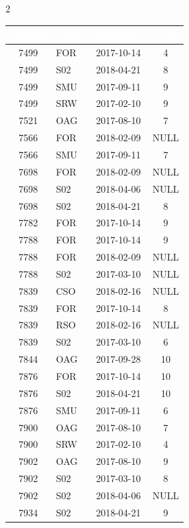 \documentclass[10pt,a4paper]{article}
\newcommand{\TBLH}[1]{\textbf{\textcolor{white}{#1}}}
\begin{document}
\begin{multicols}{2}
{\scriptsize
\begin{tabular}{|c|l|l|c|}
\hline
\rowcolor{tblhead}\TBLH{student} & \TBLH{course} & \TBLH{begindate} & \TBLH{eval} \\ \hline
7499 & FOR & 2017-10-14 & 4    \\ \hline
\rowcolor{rowalt}
7499 & S02 & 2018-04-21 & 8    \\ \hline
7499 & SMU & 2017-09-11 & 9    \\ \hline
\rowcolor{rowalt}
7499 & SRW & 2017-02-10 & 9    \\ \hline
7521 & OAG & 2017-08-10 & 7    \\ \hline
\rowcolor{rowalt}
7566 & FOR & 2018-02-09 & NULL \\ \hline
7566 & SMU & 2017-09-11 & 7    \\ \hline
\rowcolor{rowalt}
7698 & FOR & 2018-02-09 & NULL \\ \hline
7698 & S02 & 2018-04-06 & NULL \\ \hline
\rowcolor{rowalt}
7698 & S02 & 2018-04-21 & 8    \\ \hline
7782 & FOR & 2017-10-14 & 9    \\ \hline
\rowcolor{rowalt}
7788 & FOR & 2017-10-14 & 9    \\ \hline
7788 & FOR & 2018-02-09 & NULL \\ \hline
\rowcolor{rowalt}
7788 & S02 & 2017-03-10 & NULL \\ \hline
7839 & CSO & 2018-02-16 & NULL \\ \hline
\rowcolor{rowalt}
7839 & FOR & 2017-10-14 & 8    \\ \hline
7839 & RSO & 2018-02-16 & NULL \\ \hline
\rowcolor{rowalt}
7839 & S02 & 2017-03-10 & 6    \\ \hline
7844 & OAG & 2017-09-28 & 10   \\ \hline
\rowcolor{rowalt}
7876 & FOR & 2017-10-14 & 10   \\ \hline
7876 & S02 & 2018-04-21 & 10   \\ \hline
\rowcolor{rowalt}
7876 & SMU & 2017-09-11 & 6    \\ \hline
7900 & OAG & 2017-08-10 & 7    \\ \hline
\rowcolor{rowalt}
7900 & SRW & 2017-02-10 & 4    \\ \hline
7902 & OAG & 2017-08-10 & 9    \\ \hline
\rowcolor{rowalt}
7902 & S02 & 2017-03-10 & 8    \\ \hline
7902 & S02 & 2018-04-06 & NULL \\ \hline
\rowcolor{rowalt}
7934 & S02 & 2018-04-21 & 9    \\ \hline
\end{tabular}}
\end{multicols}
\end{document}
